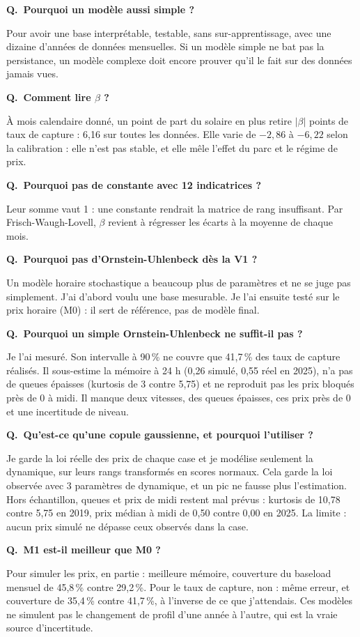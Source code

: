 \documentclass[11pt,a4paper]{article}
\newcounter{qr}
\newcommand{\qr}[2]{\stepcounter{qr}\par\medskip\noindent\textbf{Q\theqr.\ #1}\par\nopagebreak\noindent #2\par}
\begin{document}
\qr{Pourquoi un modèle aussi simple ?}{Pour avoir une base interprétable, testable, sans sur-apprentissage, avec une dizaine d'années de données mensuelles. Si un modèle simple ne bat pas la persistance, un modèle complexe doit encore prouver qu'il le fait sur des données jamais vues.}

\qr{Comment lire $\beta$ ?}{À mois calendaire donné, un point de part du solaire en plus retire $|\beta|$ points de taux de capture : 6,16 sur toutes les données. Elle varie de $-2{,}86$ à $-6{,}22$ selon la calibration : elle n'est pas stable, et elle mêle l'effet du parc et le régime de prix.}

\qr{Pourquoi pas de constante avec 12 indicatrices ?}{Leur somme vaut 1 : une constante rendrait la matrice de rang insuffisant. Par Frisch-Waugh-Lovell, $\beta$ revient à régresser les écarts à la moyenne de chaque mois.}

\qr{Pourquoi pas d'Ornstein-Uhlenbeck dès la V1 ?}{Un modèle horaire stochastique a beaucoup plus de paramètres et ne se juge pas simplement. J'ai d'abord voulu une base mesurable. Je l'ai ensuite testé sur le prix horaire (M0) : il sert de référence, pas de modèle final.}

\qr{Pourquoi un simple Ornstein-Uhlenbeck ne suffit-il pas ?}{Je l'ai mesuré. Son intervalle à 90\,\% ne couvre que 41,7\,\% des taux de capture réalisés. Il sous-estime la mémoire à 24 h (0,26 simulé, 0,55 réel en 2025), n'a pas de queues épaisses (kurtosis de 3 contre 5,75) et ne reproduit pas les prix bloqués près de 0 à midi. Il manque deux vitesses, des queues épaisses, ces prix près de 0 et une incertitude de niveau.}

\qr{Qu'est-ce qu'une copule gaussienne, et pourquoi l'utiliser ?}{Je garde la loi réelle des prix de chaque case et je modélise seulement la dynamique, sur leurs rangs transformés en scores normaux. Cela garde la loi observée avec 3 paramètres de dynamique, et un pic ne fausse plus l'estimation. Hors échantillon, queues et prix de midi restent mal prévus : kurtosis de 10,78 contre 5,75 en 2019, prix médian à midi de 0,50 contre 0,00 en 2025. La limite : aucun prix simulé ne dépasse ceux observés dans la case.}

\qr{M1 est-il meilleur que M0 ?}{Pour simuler les prix, en partie : meilleure mémoire, couverture du baseload mensuel de 45,8\,\% contre 29,2\,\%. Pour le taux de capture, non : même erreur, et couverture de 35,4\,\% contre 41,7\,\%, à l'inverse de ce que j'attendais. Ces modèles ne simulent pas le changement de profil d'une année à l'autre, qui est la vraie source d'incertitude.}
\end{document}

